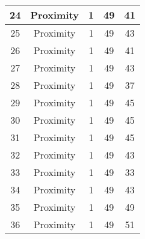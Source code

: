 \documentclass[results.tex]{subfiles}
\begin{document}
\begin{center}
\begin{tabular}{| c || c | c | c | c |}
            \hline
            24                      & Proximity                    & 1                      & 49                      & 41                   \\
            \hline
            25                      & Proximity                    & 1                      & 49                      & 43                   \\
            \hline
            26                      & Proximity                    & 1                      & 49                      & 41                   \\
            \hline
            27                      & Proximity                    & 1                      & 49                      & 43                   \\
            \hline
            28                      & Proximity                    & 1                      & 49                      & 37                   \\
            \hline
            29                      & Proximity                    & 1                      & 49                      & 45                   \\
            \hline
            30                      & Proximity                    & 1                      & 49                      & 45                   \\
            \hline
            31                      & Proximity                    & 1                      & 49                      & 45                   \\
            \hline
            32                      & Proximity                    & 1                      & 49                      & 43                   \\
            \hline
            33                      & Proximity                    & 1                      & 49                      & 33                   \\
            \hline
            34                      & Proximity                    & 1                      & 49                      & 43                   \\
            \hline
            35                      & Proximity                    & 1                      & 49                      & 49                   \\
            \hline
            36                      & Proximity                    & 1                      & 49                      & 51                   \\

\end{tabular}
\end{center}
\end{document}
